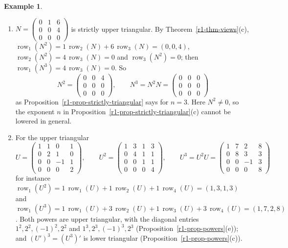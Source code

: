\documentclass[12pt]{article}
\DeclareMathOperator{\row}{row}
\theoremstyle{definition}
\newtheorem{example}[theorem]{Example}
\begin{document}
\begin{example}\label{r1-exm-powers}
\begin{enumerate}
\item \(N=\begin{pmatrix}0&1&6\\0&0&4\\0&0&0\end{pmatrix}\) is strictly upper triangular. By
Theorem~\ref{r1-thm-views}(c), \(\row_1(N^2)=1\,\row_2(N)+6\,\row_3(N)=(0,0,4)\),
\(\row_2(N^2)=4\,\row_3(N)=0\) and \(\row_3(N^2)=0\); then \(\row_1(N^3)=4\,\row_3(N)=0\). So
\[
N^2=\begin{pmatrix}0&0&4\\0&0&0\\0&0&0\end{pmatrix},\qquad N^3=N^2N=\begin{pmatrix}0&0&0\\0&0&0\\0&0&0\end{pmatrix}
\]
as Proposition~\ref{r1-prop-strictly-triangular} says for \(n=3\). Here \(N^2\ne0\), so the exponent \(n\) in
Proposition~\ref{r1-prop-strictly-triangular}(c) cannot be lowered in general.
\item For the upper triangular
\[
U=\begin{pmatrix}1&1&0&1\\0&2&1&0\\0&0&-1&1\\0&0&0&2\end{pmatrix},\qquad
U^2=\begin{pmatrix}1&3&1&3\\0&4&1&1\\0&0&1&1\\0&0&0&4\end{pmatrix},\qquad
U^3=U^2U=\begin{pmatrix}1&7&2&8\\0&8&3&3\\0&0&-1&3\\0&0&0&8\end{pmatrix}
\]
for instance \(\row_1(U^2)=1\,\row_1(U)+1\,\row_2(U)+1\,\row_4(U)=(1,3,1,3)\) and
\(\row_1(U^3)=1\,\row_1(U)+3\,\row_2(U)+1\,\row_3(U)+3\,\row_4(U)=(1,7,2,8)\). Both powers are upper triangular, with
the diagonal entries \(1^2,2^2,(-1)^2,2^2\) and \(1^3,2^3,(-1)^3,2^3\) (Proposition~\ref{r1-prop-powers}(e)); and
\((U')^3=(U^3)'\) is lower triangular (Proposition~\ref{r1-prop-powers}(c)).
\end{enumerate}
\end{example}
\end{document}
